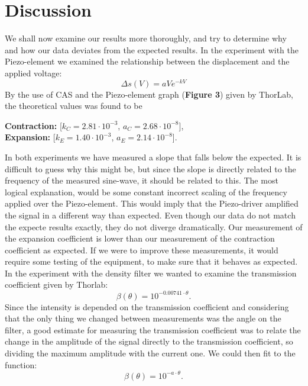 \documentclass[working, oneside]{inputs/tuftebook}
\begin{document}
\section*{Discussion}
We shall now examine our results more thoroughly, and try to determine why and how our data deviates from the expected results. In the experiment with the Piezo-element we examined the relationship between the displacement and the applied voltage:
\[
\Delta s \left( V \right)  = aV e^{-kV}
\]
By the use of CAS and the Piezo-element graph (\textbf{Figure 3}) given by ThorLab, the theoretical values was found to be
\begin{center}

\textbf{Contraction: }[$k_C = 2.81\cdot 10^{-3}$,  $a_C = 2.68 \cdot 10^{-8}$], 
\\
\textbf{Expansion: }[$k_E = 1.40 \cdot 10^{-3}$, $a_E = 2.14 \cdot 10^{-8}$].
\end{center}
 In both experiments we have measured a slope that falls below the expected. It is difficult to guess why this might be, but since the slope is directly related to the frequency of the measured sine-wave, it should be related to this. The most logical explanation, would be some constant incorrect scaling of the frequency applied over the Piezo-element. This would imply that the Piezo-driver amplified the signal in a different way than expected. Even though our data do not match the expecte results exactly, they do not diverge dramatically. Our measurement of the expansion coefficient is lower than our measurement of the contraction coefficient as expected. If we were to improve these measurements, it would require some testing of the equipment, to make sure that it behaves as expected.  \\
In the experiment with the density filter we wanted to examine the transmission coefficient given by  Thorlab: 
 \[
\beta(\theta)=10^{-0.00741\cdot \theta}
.\]
Since the intensity is depended on the transmission coefficient and considering that the only thing we changed between measurements was the angle on the filter, a good estimate for measuring the transmission coefficient was to relate the change in the amplitude of the signal directly to the transmission coefficient, so dividing the maximum amplitude with the current one. We could then fit to the function:
 \[
\beta(\theta)=10^{-a\cdot \theta}
.\]
\end{document}
